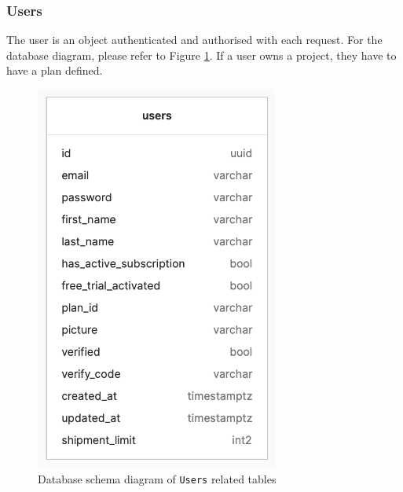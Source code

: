 \subsubsection{Users}
The user is an object authenticated and authorised with each request.
For the database diagram, please refer to Figure \ref{imgdocs:db-schema-users}.
If a user owns a project, they have to have a plan defined.

\begin{figure}[H]\centering
\includegraphics[width=80mm]{img/docs/fig_db_schema_users.png}
\caption{Database schema diagram of \texttt{Users} related tables}
\label{imgdocs:db-schema-users}
\end{figure}

